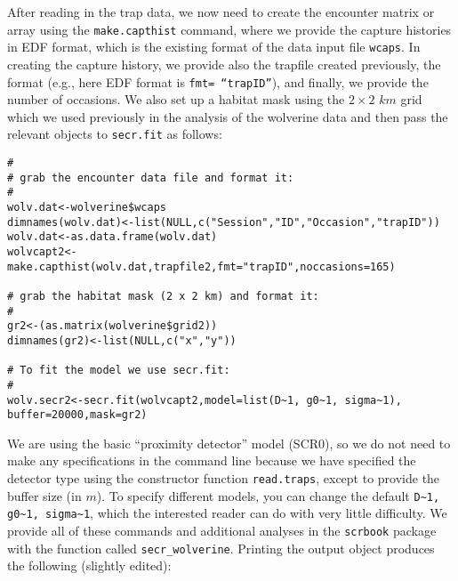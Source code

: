 After reading in the trap data, we now need to create the encounter matrix
or array using the
\mbox{\tt make.capthist} command, where we provide the capture
histories in EDF format, which is the existing format of
the data input file \mbox{\tt wcaps}.
In creating the capture history, we provide also the trapfile created
previously, the format (e.g., here EDF format is \mbox{\tt fmt=
  ``trapID''}), 
and finally, we provide the number of occasions. We also set up a
habitat mask using the $2 \times 2$ $km$ grid which we used previously
in the analysis of the wolverine data and then pass the relevant
objects to \mbox{\tt secr.fit} as follows:
{\small 
\begin{verbatim}
#
# grab the encounter data file and format it:
#
wolv.dat<-wolverine$wcaps
dimnames(wolv.dat)<-list(NULL,c("Session","ID","Occasion","trapID"))
wolv.dat<-as.data.frame(wolv.dat)
wolvcapt2<-make.capthist(wolv.dat,trapfile2,fmt="trapID",noccasions=165)

# grab the habitat mask (2 x 2 km) and format it:
#
gr2<-(as.matrix(wolverine$grid2))
dimnames(gr2)<-list(NULL,c("x","y"))

# To fit the model we use secr.fit:
#
wolv.secr2<-secr.fit(wolvcapt2,model=list(D~1, g0~1, sigma~1), buffer=20000,mask=gr2)
\end{verbatim}
}
We are using the 
basic ``proximity detector'' model (SCR0), so we do not need to make any specifications in
the command line because we have specified the detector type using the
constructor function \mbox{\tt read.traps},
except to provide the buffer size (in $m$).  To
specify different models, you can change the default
\verb#D~1, g0~1, sigma~1#, which the interested reader can do with
very little difficulty. We provide all of these commands and
additional analyses in the \mbox{\tt scrbook} package with the
function called \mbox{\tt secr\_wolverine}. Printing the output object
produces the following (slightly edited):


